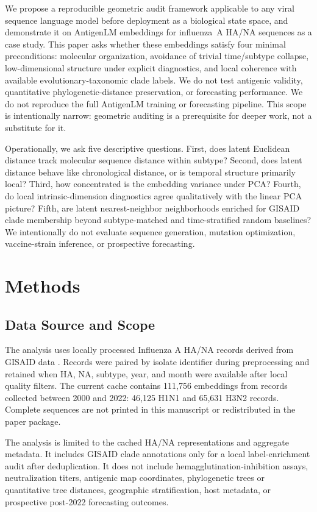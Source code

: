 \documentclass[11pt]{article}
\begin{document}
We propose a reproducible geometric audit framework applicable to any viral sequence language model before deployment as a biological state space, and demonstrate it on AntigenLM embeddings for influenza~A HA/NA sequences as a case study. This paper asks whether these embeddings satisfy four minimal preconditions: molecular organization, avoidance of trivial time/subtype collapse, low-dimensional structure under explicit diagnostics, and local coherence with available evolutionary-taxonomic clade labels. We do not test antigenic validity, quantitative phylogenetic-distance preservation, or forecasting performance. We do not reproduce the full AntigenLM training or forecasting pipeline. This scope is intentionally narrow: geometric auditing is a prerequisite for deeper work, not a substitute for it.

Operationally, we ask five descriptive questions. First, does latent Euclidean distance track molecular sequence distance within subtype? Second, does latent distance behave like chronological distance, or is temporal structure primarily local? Third, how concentrated is the embedding variance under PCA? Fourth, do local intrinsic-dimension diagnostics agree qualitatively with the linear PCA picture? Fifth, are latent nearest-neighbor neighborhoods enriched for GISAID clade membership beyond subtype-matched and time-stratified random baselines? We intentionally do not evaluate sequence generation, mutation optimization, vaccine-strain inference, or prospective forecasting.

\section{Methods}

\subsection{Data Source and Scope}

The analysis uses locally processed Influenza A HA/NA records derived from GISAID data \cite{shu2017gisaid}. Records were paired by isolate identifier during preprocessing and retained when HA, NA, subtype, year, and month were available after local quality filters. The current cache contains 111,756 embeddings from records collected between 2000 and 2022: 46,125 H1N1 and 65,631 H3N2 records. Complete sequences are not printed in this manuscript or redistributed in the paper package.

The analysis is limited to the cached HA/NA representations and aggregate metadata. It includes GISAID clade annotations only for a local label-enrichment audit after deduplication. It does not include hemagglutination-inhibition assays, neutralization titers, antigenic map coordinates, phylogenetic trees or quantitative tree distances, geographic stratification, host metadata, or prospective post-2022 forecasting outcomes.
\end{document}

